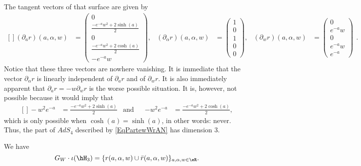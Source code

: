 The tangent vectors of that surface are given by
\begin{equation}
	\begin{aligned}[]
		(\partial_ar)(a,\alpha,w)&=
\begin{pmatrix}
	0	\\
	\frac{ - e^{-a}w^2+2\sinh(a) }{2}	\\
	0	\\
	\frac{ - e^{-a}w^2+2\cosh(a) }{2}	\\
	- e^{-a}w
\end{pmatrix}
,&
		(\partial_{\alpha}r)(a,\alpha,w)&=
\begin{pmatrix}
	1	\\
	0\\
	1	\\
	0\\
	0
\end{pmatrix}
,&
		(\partial_wr)(a,\alpha,w)&=
\begin{pmatrix}
	0	\\
	 e^{-a}w\\
	0	\\
	 e^{-a}w\\
	e^{-a}
\end{pmatrix}
	\end{aligned}.
\end{equation}
Notice that these three vectors are nowhere vanishing. It is immediate that the vector $\partial_{\alpha}r$ is linearly independent of $\partial_{a}r$ and of $\partial_wr$. It is also immediately apparent that $\partial_ar=-w\partial_wr$ is the worse possible situation. It is, however, not possible because it would imply that
\begin{equation}
	\begin{aligned}[]
		-w^2 e^{-a}&=\frac{ - e^{-a}w^2+2\sinh(a) }{2}&\text{and}&&-w^2 e^{-a}&=\frac{ - e^{-a}w^2+2\cosh(a) }{2},
	\end{aligned}
\end{equation}
which is only possible when $\cosh(a)=\sinh(a)$, in other words: never. Thus, the part of $AdS_4$ described by \eqref{EqPartewWrAN} has dimension $3$.


\begin{proposition}
We have
\begin{equation}
	 G_W\cdot\iota(\hH_3)=
	\{ r(a,\alpha,w)\cup\bar r(a,\alpha,w) \}_{a,\alpha,w\in\eR}.
\end{equation}
\end{proposition}

